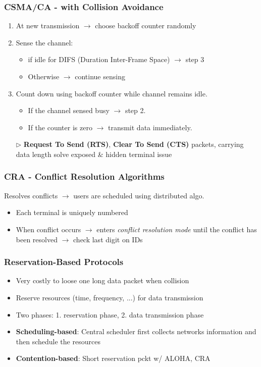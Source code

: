 \subsubsection{CSMA/CA - with Collision Avoidance}
\begin{enumerate}
	\item At new transmission $\rightarrow$ choose backoff counter randomly
	\item Sense the channel: 
	\begin{itemize}
		\item if idle for DIFS (Duration Inter-Frame Space) $\rightarrow$ step 3 
		\item Otherwise $\rightarrow$ continue sensing
	\end{itemize}
	\item Count down using backoff counter while channel remains idle. 
	\begin{itemize}
		\item If the channel sensed busy $\rightarrow$ step 2. 
		\item If the counter is zero $\rightarrow$ transmit data immediately.
	\end{itemize}
	\item[$\triangleright$] \textbf{Request To Send (RTS)}, \textbf{Clear To Send (CTS)} packets, carrying data length solve exposed \& hidden terminal issue
\end{enumerate}
\subsubsection{CRA - Conflict Resolution Algorithms}
Resolves conflicts $\rightarrow$ users are scheduled using distributed algo.
\begin{itemize}
	\item Each terminal is uniquely numbered
	\item When conflict occurs $\rightarrow$ enters \textit{conflict resolution mode} until the conflict has been resolved $\rightarrow$ check last digit on IDs
\end{itemize}
\subsubsection{Reservation-Based Protocols}
\begin{itemize}
	\item Very costly to loose one long data packet when collision
	\item Reserve resources (time, frequency, ...) for data transmission
	\item Two phases: 1. reservation phase, 2. data transmission phase
	\item \textbf{Scheduling-based}: Central scheduler first collects networks information and then schedule the resources
	\item \textbf{Contention-based}: Short reservation pckt w/ ALOHA, CRA
\end{itemize}

